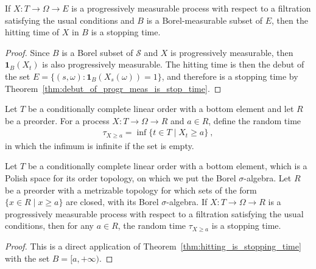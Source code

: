\begin{theorem}\label{thm:hitting_is_stopping_time}
  \leanok
If $X : T \to \Omega \to E$ is a progressively measurable process with respect to a filtration satisfying the usual conditions and $B$ is a Borel-measurable subset of $E$, then the hitting time of $X$ in $B$ is a stopping time.
\end{theorem}

\begin{proof}\leanok
Since $B$ is a Borel subset of $\mathcal{S}$ and $X$ is progressively measurable, then $\mathbf{1}_B(X_t)$ is also progressively measurable.
The hitting time is then the debut of the set $E = \{(s,\omega) : \mathbf{1}_B(X_s(\omega)) = 1\}$, and therefore is a stopping time by Theorem~\ref{thm:debut_of_progr_meas_is_stop_time}.
\end{proof}


\begin{definition}\label{def:leastGE}
  \mathlibok
Let $T$ be a conditionally complete linear order with a bottom element and let $R$ be a preorder.
For a process $X : T \to Ω \to R$ and $a \in R$, define the random time
\begin{align*}
  \tau_{X \ge a} = \inf\{t \in T \mid X_t \ge a\} \: ,
\end{align*}
in which the infimum is infinite if the set is empty.
\end{definition}


\begin{lemma}\label{lem:isStoppingTime_leastGE}
  \leanok
Let $T$ be a conditionally complete linear order with a bottom element, which is a Polish space for its order topology, on which we put the Borel $\sigma$-algebra.
Let $R$ be a preorder with a metrizable topology for which sets of the form $\{x \in R \mid x \ge a\}$ are closed, with its Borel $\sigma$-algebra.
If $X : T \to Ω \to R$ is a progressively measurable process with respect to a filtration satisfying the usual conditions, then for any $a \in R$, the random time $\tau_{X \ge a}$ is a stopping time.
\end{lemma}

\begin{proof}\leanok
This is a direct application of Theorem~\ref{thm:hitting_is_stopping_time} with the set $B = [a, +\infty)$.
\end{proof}


